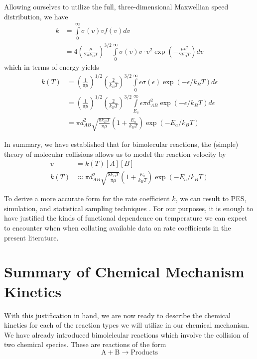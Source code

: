 Allowing ourselves to utilize the full, three-dimensional Maxwellian speed distribution, we have
\begin{equation}
  \begin{aligned}
  k &= \int\limits_0^\infty \sigma(v)v f(v) dv \\
  &= 4\left(\frac{\mu}{2\pi k_BT} \right)^{3/2}\int\limits_0^\infty \sigma(v)v \cdot v^2\exp\left(-\frac{\mu v^2}{2k_BT} \right)dv
  \end{aligned}
\end{equation}
which in terms of energy yields
\begin{equation}
  \begin{aligned}
  k(T) &= \left(\frac{1}{\pi \mu} \right)^{1/2}\left(\frac{2}{k_BT}\right)^{3/2}\int\limits_{0}^{\infty}\epsilon\sigma(\epsilon)\exp(-\epsilon/k_BT)d\epsilon \\
  &= \left(\frac{1}{\pi \mu} \right)^{1/2}\left(\frac{2}{k_BT}\right)^{3/2}\int\limits_{E_a}^{\infty}\epsilon\pi d_{AB}^2\exp(-\epsilon/k_BT)d\epsilon \\
  &= \pi d_{AB}^2 \sqrt{\frac{8k_BT}{\pi \mu}}\left(1 + \frac{E_a}{k_BT} \right)\exp(-E_a/k_BT)
  \end{aligned}
\end{equation}

In summary, we have established that for bimolecular reactions, the (simple) theory of molecular collisions allows us to model the reaction velocity by
\begin{align}
  v &= k(T)[A][B] \\
  k(T) &\approx \pi d_{AB}^2 \sqrt{\frac{8k_BT}{\pi \mu}}\left(1 + \frac{E_a}{k_BT}\right)\exp(-E_a/k_BT)
\end{align}

To derive a more accurate form for the rate coefficient $k$, we can result to PES, simulation, and statistical sampling techniques \cite[for example]{pes-h-h2, pes-for-k}. For our purposes, it is enough to have justified the kinds of functional dependence on temperature we can expect to encounter when when collating available data on rate coefficients in the present literature.



\section{Summary of Chemical Mechanism Kinetics}

With this justification in hand, we are now ready to describe the chemical kinetics for each of the reaction types we will utilize in our chemical mechanism. We have already introduced bimolelcular reactions which involve the collision of two chemical species. These are reactions of the form
\begin{equation}
  \mathrm{A} + \mathrm{B} \longrightarrow \text{Products}
\end{equation}

